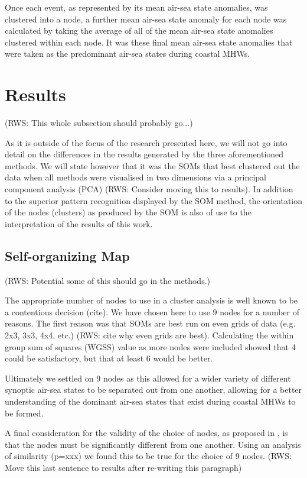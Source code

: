 \documentclass[a4paper,10pt,review]{elsarticle}
\begin{document}
Once each event, as represented by its mean air-sea state anomalies, was clustered into a node, a further mean air-sea state anomaly for each node was calculated by taking the average of all of the mean air-sea state anomalies clustered within each node. It was these final mean air-sea state anomalies that were taken as the predominant air-sea states during coastal MHWs.

\section{Results}

(RWS: This whole subsection should probably go...)

As it is outside of the focus of the research presented here, we will not go into detail on the differences in the results generated by the three aforementioned methods. We will state however that it was the SOMs that best clustered out the data when all methods were visualised in two dimensions via a principal component analysis (PCA) (RWS: Consider moving this to results). In addition to the superior pattern recognition displayed by the SOM method, the orientation of the nodes (clusters) as produced by the SOM is also of use to the interpretation of the results of this work.

\subsection{Self-organizing Map}

(RWS: Potential some of this should go in the methods.)

The appropriate number of nodes to use in a cluster analysis is well known to be a contentious decision (cite). We have chosen here to use 9 nodes for a number of reasons. The first reason was that SOMs are best run on even grids of data (e.g. 2x3, 3x3, 4x4, etc.) (RWS: cite why even grids are best). Calculating the within group sum of squares (WGSS) value as more nodes were included showed that 4 could be satisfactory, but that at least 6 would be better. 


Ultimately we settled on 9 nodes as this allowed for a wider variety of different synoptic air-sea states to be separated out from one another, allowing for a better understanding of the dominant air-sea states that exist during coastal MHWs to be formed. 

A final consideration for the validity of the choice of nodes, as proposed in \citet{Johnson2013}, is that the nodes must be significantly different from one another. Using an analysis of similarity (p=xxx) we found this to be true for the choice of 9 nodes. (RWS: Move this last sentence to results after re-writing this paragraph)
\end{document}
